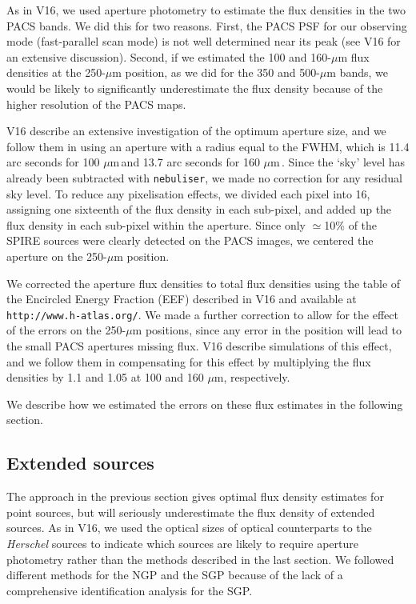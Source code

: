 \documentclass[useAMS,usenatbib]{mnras}
\def\mic{ $\mu $m\,}
\begin{document}
As in V16, we used aperture photometry to estimate the
flux densities in the two PACS bands. We did this for
two reasons. First, the
PACS PSF for our observing mode
(fast-parallel scan mode)
is not well determined near its peak (see V16 for an
extensive discussion). Second, if we estimated the 100 and
160-$\mu$m flux densities at the 250-$\mu$m position, as we
did for the 350 and 500-$\mu$m bands, we would be likely
to significantly underestimate the flux density because of
the higher resolution of the PACS maps.

V16 describe an extensive investigation of the optimum
aperture size, and we follow them in using an aperture
with a radius equal to the FWHM, which is
11.4 arc seconds for 100\mic and 13.7 arc seconds for
160\mic. Since the `sky' level has already been subtracted
with {\tt nebuliser}, we made no correction for any
residual sky level.
To reduce any pixelisation
effects, we divided each pixel into 16, assigning
one sixteenth of the flux density in each sub-pixel, and  
added up the flux density in each sub-pixel within the
aperture. 
Since only $\simeq$10\% of the
SPIRE sources were clearly detected on the PACS images,
we centered the aperture on the 250-$\mu$m position.

We corrected the aperture flux densities to
total flux densities using the 
table of the Encircled Energy Fraction (EEF)
described in V16 and available at {\tt
http://www.h-atlas.org/}.  
We made a further correction
to allow for the effect of the errors on the 250-$\mu$m positions,
since any error in the position will lead to the small PACS apertures
missing flux. V16 describe simulations of this effect, and we
follow them in compensating for this effect by multiplying the
flux densities by 1.1 and 1.05 at 100 and 160 $\mu$m, respectively.

We describe how we estimated the errors on these flux estimates in the
following section.

\subsection{Extended sources} 

The approach in the previous section gives optimal flux density
estimates for point sources, but will seriously underestimate the flux
density of extended sources.  As in V16, we used the optical sizes of
optical counterparts to the {\it Herschel} sources to indicate which
sources are likely to require aperture photometry rather than the
methods described in the last section.  We followed different methods
for the NGP and the SGP because of the lack of a comprehensive
identification analysis for the SGP.
\end{document}
